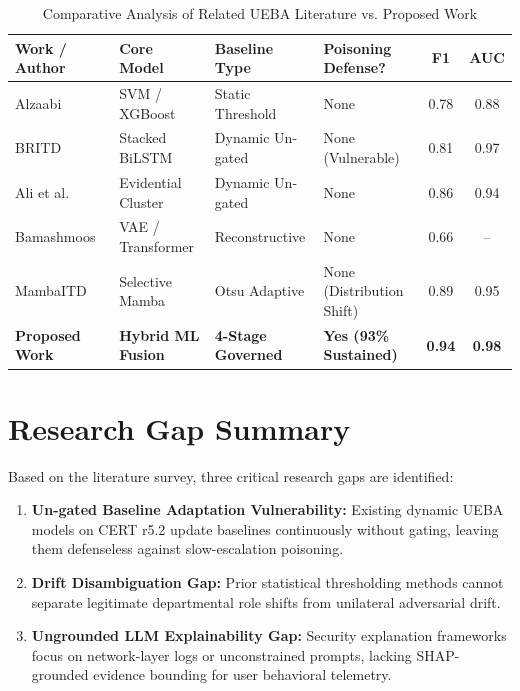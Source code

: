 \documentclass[12pt,a4paper]{report}
\begin{document}
\begin{table}[htbp]
\caption{Comparative Analysis of Related UEBA Literature vs. Proposed Work}
\label{tab:lit_comparison}
\centering
\small
\begin{tabularx}{\textwidth}{l X X X c c}
\toprule
\textbf{Work / Author} & \textbf{Core Model} & \textbf{Baseline Type} & \textbf{Poisoning Defense?} & \textbf{F1} & \textbf{AUC} \\
\midrule
Alzaabi~\cite{alzaabi2024review} & SVM / XGBoost & Static Threshold & None & 0.78 & 0.88 \\
BRITD~\cite{song2024britd} & Stacked BiLSTM & Dynamic Un-gated & None (Vulnerable) & 0.81 & 0.97 \\
Ali et al.~\cite{ali2025realtime} & Evidential Cluster & Dynamic Un-gated & None & 0.86 & 0.94 \\
Bamashmoos~\cite{bamashmoos2025adaptive} & VAE / Transformer & Reconstructive & None & 0.66 & -- \\
MambaITD~\cite{kong2026mambaitd} & Selective Mamba & Otsu Adaptive & None (Distribution Shift) & 0.89 & 0.95 \\
\textbf{Proposed Work} & \textbf{Hybrid ML Fusion} & \textbf{4-Stage Governed} & \textbf{Yes (93\% Sustained)} & \textbf{0.94} & \textbf{0.98} \\
\bottomrule
\end{tabularx}
\end{table}

\section{Research Gap Summary}
Based on the literature survey, three critical research gaps are identified:
\begin{enumerate}
    \item \textbf{Un-gated Baseline Adaptation Vulnerability:} Existing dynamic UEBA models on CERT r5.2 update baselines continuously without gating, leaving them defenseless against slow-escalation poisoning.
    \item \textbf{Drift Disambiguation Gap:} Prior statistical thresholding methods cannot separate legitimate departmental role shifts from unilateral adversarial drift.
    \item \textbf{Ungrounded LLM Explainability Gap:} Security explanation frameworks focus on network-layer logs or unconstrained prompts, lacking SHAP-grounded evidence bounding for user behavioral telemetry.
\end{enumerate}
\end{document}
